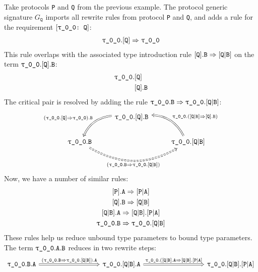 \documentclass[../generics]{subfiles}
\begin{document}
\begin{example}\label{proto assoc rule 2}
Take protocols \texttt{P} and \texttt{Q} from the previous example. The protocol generic signature $G_\texttt{Q}$ imports all rewrite rules from protocol \texttt{P} and \texttt{Q}, and adds a rule for the requirement $[\texttt{\texttt{$\uptau$\_0\_0}:~Q}]$:
\begin{gather*}
\texttt{$\uptau$\_0\_0}.[\texttt{Q}]\Rightarrow \texttt{$\uptau$\_0\_0}
\end{gather*}
This rule overlaps with the associated type introduction rule $[\texttt{Q}].\texttt{B}\Rightarrow[\texttt{Q}|\texttt{B}]$ on the term
$\texttt{$\uptau$\_0\_0}.[\texttt{Q}].\texttt{B}$:
\begin{align*}
\texttt{$\uptau$\_0\_0}.&[\texttt{Q}]\\
&[\texttt{Q}].\texttt{B}
\end{align*}
The critical pair is resolved by adding the rule $\texttt{$\uptau$\_0\_0}.\texttt{B}\Rightarrow\texttt{$\uptau$\_0\_0}.[\texttt{Q}|\texttt{B}]$:
\[
\begin{tikzcd}
&\ttgp{0}{0}.\protosym{Q}.\texttt{B}\arrow[ld, Rightarrow, "(\ProtoConf{\ttgp{0}{0}}{Q}).\texttt{B}"', bend right]\\
\ttgp{0}{0}.\texttt{B}\arrow[rr, Rightarrow, "(\ttgp{0}{0}.\texttt{B}\Rightarrow\ttgp{0}{0}.\assocsym{Q}{B})"', bend right, dashed]&&
\ttgp{0}{0}.\assocsym{Q}{B}\arrow[ul, Rightarrow, "\ttgp{0}{0}.(\AssocIntroInv{Q}{B})"', bend right]
\end{tikzcd}
\]
Now, we have a number of similar rules:
\begin{gather*}
\AssocIntro{P}{A}\\
\AssocIntro{Q}{B}\\
\assocsym{Q}{B}.\texttt{A}\Rightarrow\assocsym{Q}{B}.\assocsym{P}{A}\\
\ttgp{0}{0}.\texttt{B}\Rightarrow\ttgp{0}{0}.\assocsym{Q}{B}
\end{gather*}
These rules help us reduce unbound type parameters to bound type parameters. The term $\texttt{$\uptau$\_0\_0}.\texttt{A}.\texttt{B}$ reduces in two rewrite steps:
\[
\begin{tikzcd}[column sep=9em]
\ttgp{0}{0}.\texttt{B}.\texttt{A}\arrow[r, Rightarrow, "(\ttgp{0}{0}.\texttt{B}\Rightarrow\ttgp{0}{0}.\assocsym{Q}{B}).\texttt{A}"]&
\ttgp{0}{0}.\assocsym{Q}{B}.\texttt{A}\arrow[r, Rightarrow, "\ttgp{0}{0}.(\assocsym{Q}{B}.\texttt{A}\Rightarrow\assocsym{Q}{B}.\assocsym{P}{A}"]&
\ttgp{0}{0}.\assocsym{Q}{B}.\assocsym{P}{A}
\end{tikzcd}
\]
\end{example}
\end{document}
